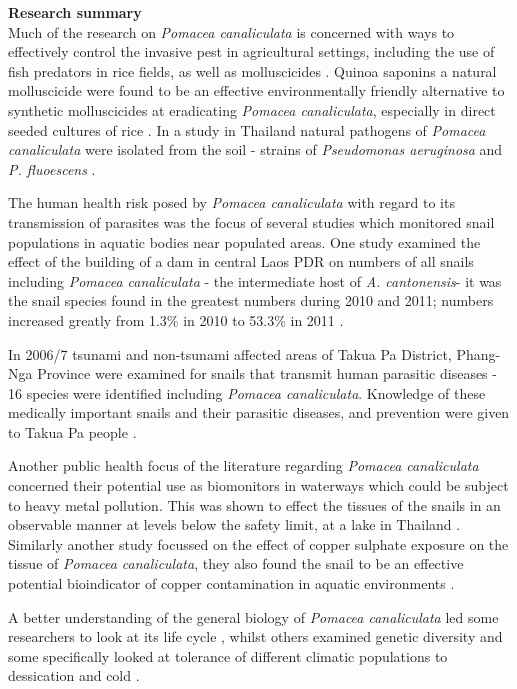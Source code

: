 \documentclass[]{book}
\theoremstyle{definition}
\theoremstyle{definition}
\theoremstyle{definition}
\theoremstyle{remark}
\begin{document}
\textbf{Research summary}\\
Much of the research on \emph{Pomacea canaliculata} is concerned with
ways to effectively control the invasive pest in agricultural settings,
including the use of fish predators in rice fields, as well as
molluscicides \citep{De_La_Cruz_2001, Su_Sin_2006}. Quinoa saponins a
natural molluscicide were found to be an effective environmentally
friendly alternative to synthetic molluscicides at eradicating
\emph{Pomacea canaliculata}, especially in direct seeded cultures of
rice \citep{Joshi_2008}. In a study in Thailand natural pathogens of
\emph{Pomacea canaliculata} were isolated from the soil - strains of
\emph{Pseudomonas aeruginosa} and \emph{P. fluoescens}
\citep{Chobchuenchom_2003}.

The human health risk posed by \emph{Pomacea canaliculata} with regard
to its transmission of parasites was the focus of several studies which
monitored snail populations in aquatic bodies near populated areas. One
study examined the effect of the building of a dam in central Laos PDR
on numbers of all snails including \emph{Pomacea canaliculata} - the
intermediate host of \emph{A. cantonensis}- it was the snail species
found in the greatest numbers during 2010 and 2011; numbers increased
greatly from 1.3\% in 2010 to 53.3\% in 2011 \citep{Brey_2015}.

In 2006/7 tsunami and non-tsunami affected areas of Takua Pa District,
Phang-Nga Province were examined for snails that transmit human
parasitic diseases - 16 species were identified including \emph{Pomacea
canaliculata}. Knowledge of these medically important snails and their
parasitic diseases, and prevention were given to Takua Pa people
\citep{Butraporn_2010}.

Another public health focus of the literature regarding \emph{Pomacea
canaliculata} concerned their potential use as biomonitors in waterways
which could be subject to heavy metal pollution. This was shown to
effect the tissues of the snails in an observable manner at levels below
the safety limit, at a lake in Thailand \citep{Dummee_2012}. Similarly
another study focussed on the effect of copper sulphate exposure on the
tissue of \emph{Pomacea canaliculata}, they also found the snail to be
an effective potential bioindicator of copper contamination in aquatic
environments \citep{Dummee_2015}.

A better understanding of the general biology of \emph{Pomacea
canaliculata} led some researchers to look at its life cycle
\citep{Arfan_2015}, whilst others examined genetic diversity
\citep{Bai_2011} and some specifically looked at tolerance of different
climatic populations to dessication and cold \citep{Wada_2011}.
\end{document}
